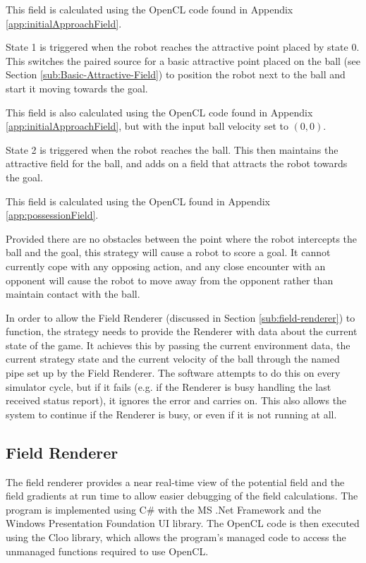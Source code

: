 \documentclass[10pt]{article}
\begin{document}
This field is calculated using the OpenCL code found in Appendix
\ref{app:initialApproachField}.

State 1 is triggered when the robot reaches the attractive point placed by state
0.  This switches the paired source for a basic attractive point placed on the
ball (see Section \ref{sub:Basic-Attractive-Field}) to position the robot next
to the ball and start it moving towards the goal.

This field is also calculated using the OpenCL code found in Appendix
\ref{app:initialApproachField}, but with the input ball velocity set to
$\left(0,0\right)$.

State 2 is triggered when the robot reaches the ball.  This then maintains the
attractive field for the ball, and adds on a field that attracts the robot
towards the goal.

This field is calculated using the OpenCL found in Appendix
\ref{app:possessionField}.

Provided there are no obstacles between the point where the robot intercepts the
ball and the goal, this strategy will cause a robot to score a goal.  It cannot
currently cope with any opposing action, and any close encounter with an
opponent will cause the robot to move away from the opponent rather than
maintain contact with the ball.

In order to allow the Field Renderer (discussed in Section
\ref{sub:field-renderer}) to function, the strategy needs to provide the
Renderer with data about the current state of the game.  It achieves this by
passing the current environment data, the current strategy state and the current
velocity of the ball through the named pipe set up by the Field Renderer.  The
software attempts to do this on every simulator cycle, but if it fails (e.g. if
the Renderer is busy handling the last received status report), it ignores the
error and carries on.  This also allows the system to continue if the Renderer
is busy, or even if it is not running at all.

\subsection{Field Renderer\label{sub:field-renderer}}

The field renderer provides a near real-time view of the potential field and the
field gradients at run time to allow easier debugging of the field calculations.
The program is implemented using C\# with the MS .Net Framework and the Windows
Presentation Foundation UI library. The OpenCL code is then executed using the
Cloo library, which allows the program's managed code to access the unmanaged
functions required to use OpenCL.
\end{document}
